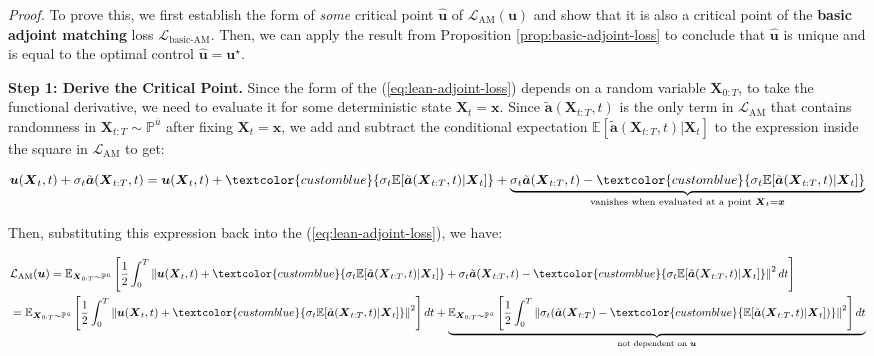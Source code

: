 \documentclass{article}
\newcommand{\bluetext}[1]{\textcolor{customblue}{#1}}
\begin{document}
\textit{Proof.} To prove this, we first establish the form of \textit{some} critical point $\hat{\boldsymbol{u}}$ of $\mathcal{L}_{\text{AM}}(\boldsymbol{u})$ and show that it is also a critical point of the \textbf{basic adjoint matching} loss $\mathcal{L}_{\text{basic-AM}}$. Then, we can apply the result from Proposition \ref{prop:basic-adjoint-loss} to conclude that $\hat{\boldsymbol{u}}$ is unique and is equal to the optimal control $\hat{\boldsymbol{u}}=\boldsymbol{u}^\star$.

\textbf{Step 1: Derive the Critical Point.} 
Since the form of the (\ref{eq:lean-adjoint-loss}) depends on a random variable $\boldsymbol{X}_{0:T}$, to take the functional derivative, we need to evaluate it for some deterministic state $\boldsymbol{X}_t=\boldsymbol{x}$. Since $\tilde{\boldsymbol{a}}(\boldsymbol{X}_{t:T},t)$ is the only term in $\mathcal{L}_{\text{AM}}$ that contains randomness in $\boldsymbol{X}_{t:T}\sim \mathbb{P}^{\bar{u}}$ after fixing $\boldsymbol{X}_t=\boldsymbol{x}$, we add and subtract the conditional expectation $\mathbb{E}[\tilde{\boldsymbol{a}}(\boldsymbol{X}_{t:T},t)|\boldsymbol{X}_t]$ to the expression inside the square in $\mathcal{L}_{\text{AM}}$ to get:
\begin{small}
\begin{align}
    \boldsymbol{u}(\boldsymbol{X}_t,t)+\sigma_t\tilde{\boldsymbol{a}}(\boldsymbol{X}_{t:T},t)=\boldsymbol{u}(\boldsymbol{X}_t,t)+\bluetext{\sigma_t\mathbb{E}[\tilde{\boldsymbol{a}}(\boldsymbol{X}_{t:T},t)|\boldsymbol{X}_t]}+\underbrace{\sigma_t\tilde{\boldsymbol{a}}(\boldsymbol{X}_{t:T},t)-\bluetext{\sigma_t\mathbb{E}[\tilde{\boldsymbol{a}}(\boldsymbol{X}_{t:T},t)|\boldsymbol{X}_t]}}_{\text{vanishes when evaluated at a point }\boldsymbol{X}_t=\boldsymbol{x}}
\end{align}
\end{small}
Then, substituting this expression back into the (\ref{eq:lean-adjoint-loss}), we have:
\begin{small}
\begin{align}
    &\mathcal{L}_{\text{AM}}(\boldsymbol{u})=\mathbb{E}_{\boldsymbol{X}_{0:T}\sim \mathbb{P}^{\bar{u}}}\left[\frac{1}{2}\int_0^T\left\|\boldsymbol{u}(\boldsymbol{X}_t,t)+\bluetext{\sigma_t\mathbb{E}[\tilde{\boldsymbol{a}}(\boldsymbol{X}_{t:T},t)|\boldsymbol{X}_t]}+\sigma_t\tilde{\boldsymbol{a}}(\boldsymbol{X}_{t:T},t)-\bluetext{\sigma_t\mathbb{E}[\tilde{\boldsymbol{a}}(\boldsymbol{X}_{t:T},t)|\boldsymbol{X}_t]}\right\|^2dt\right]\nonumber\\
    &=\mathbb{E}_{\boldsymbol{X}_{0:T}\sim \mathbb{P}^{\bar{u}}}\left[\frac{1}{2}\int_0^T\left\|\boldsymbol{u}(\boldsymbol{X}_t,t)+\bluetext{\sigma_t\mathbb{E}[\tilde{\boldsymbol{a}}(\boldsymbol{X}_{t:T},t)|\boldsymbol{X}_t]}\right\|^2\right]dt+\underbrace{\mathbb{E}_{\boldsymbol{X}_{0:T}\sim \mathbb{P}^{\bar{u}}}\left[\frac{1}{2}\int_0^T\left\|\sigma_t(\tilde{\boldsymbol{a}}(\boldsymbol{X}_{t:T})-\bluetext{\mathbb{E}[\tilde{\boldsymbol{a}}(\boldsymbol{X}_{t:T},t)|\boldsymbol{X}_t])}\right\|^2\right]dt}_{\text{not dependent on }\boldsymbol{u}}\nonumber
\end{align}
\end{small}
\end{document}
